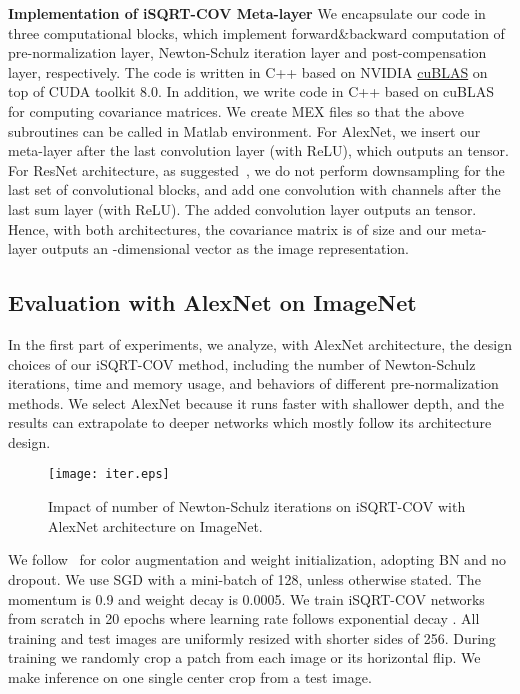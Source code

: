 \documentclass[10pt,twocolumn,letterpaper]{article}
\begin{document}
\vspace{4pt}\noindent\textbf{Implementation of iSQRT-COV Meta-layer}\quad
We encapsulate our code in three computational blocks, which implement  forward\&backward  computation of pre-normalization layer, Newton-Schulz iteration layer and post-compensation layer, respectively. The code is written in C++ based on NVIDIA \href{http://docs.nvidia.com/cuda/cublas/}{cuBLAS} on top of  CUDA toolkit 8.0.  In addition, we write code in C++ based on cuBLAS for computing covariance matrices. We create MEX files so that the above subroutines can be called  in Matlab environment. For AlexNet, we insert  our meta-layer after the last convolution layer (with ReLU), which outputs an  tensor. For ResNet architecture, as suggested~\cite{Li_2017_ICCV}, we do not perform downsampling for the last set of convolutional blocks, and  add one  convolution with  channels after the last sum layer (with ReLU). The added  convolution layer outputs an  tensor. Hence, with both architectures, the covariance matrix  is of size  and our meta-layer outputs an -dimensional vector as the image representation.


\subsection{Evaluation with AlexNet on ImageNet}\label{section:ImageNet-AlexNet}

In the first part of experiments, we analyze, with AlexNet architecture, the design choices of our iSQRT-COV method, including the number of Newton-Schulz iterations,  time and memory usage, and behaviors of different pre-normalization methods.  We select AlexNet because it runs faster with shallower depth, and the results can  extrapolate to deeper networks  which mostly follow its architecture design. 


\begin{figure}
\centering
\begin{minipage}[b]{0.65\linewidth}
\centering
\texttt{[image: iter.eps]}
\end{minipage}
\caption{Impact of  number  of Newton-Schulz iterations on iSQRT-COV with AlexNet architecture on ImageNet.}
\label{fig:impact_iteration-N}
\end{figure}

We follow~\cite{Li_2017_ICCV} for color augmentation and weight initialization, adopting BN and no dropout. We use SGD with  a mini-batch of 128,  unless otherwise stated. The momentum is  0.9 and  weight decay is 0.0005. We train iSQRT-COV networks from scratch in 20 epochs where  learning rate follows exponential decay  . All training and test images are uniformly resized with shorter sides of 256. During training we randomly crop a  patch from each image or its horizontal flip. We make inference on one single   center crop from a test image. 
\end{document}
